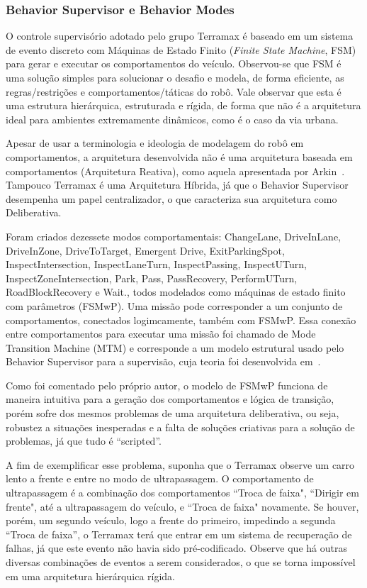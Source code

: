 \subsubsection{Behavior Supervisor e Behavior Modes}

O controle supervisório adotado pelo grupo Terramax é baseado em um sistema de
evento discreto com Máquinas de Estado Finito (\textit{Finite State Machine},
FSM) para gerar e executar os comportamentos do veículo. Observou-se que FSM é
uma solução simples para solucionar o desafio e modela, de forma eficiente, as
regras/restrições e comportamentos/táticas do robô. Vale observar que esta é uma
estrutura hierárquica, estruturada e rígida, de forma que não é a arquitetura
ideal para ambientes extremamente dinâmicos, como é o caso da via urbana. 

Apesar de usar a terminologia e ideologia de modelagem do robô em
comportamentos, a arquitetura desenvolvida não é uma arquitetura baseada em
comportamentos (Arquitetura Reativa), como aquela apresentada por
Arkin~\cite{arkin1998behavior}. Tampouco Terramax é uma Arquitetura
Híbrida, já que o Behavior Supervisor desempenha um papel centralizador, o que 
caracteriza sua arquitetura como Deliberativa.

Foram criados dezessete modos comportamentais: ChangeLane, DriveInLane,
DriveInZone, DriveToTarget, Emergent Drive, ExitParkingSpot,
InspectIntersection, InspectLaneTurn, InspectPassing, InspectUTurn,
InspectZoneIntersection, Park, Pass, PassRecovery, PerformUTurn,
RoadBlockRecovery e Wait., todos modelados como máquinas de estado finito
com parâmetros (FSMwP). Uma missão pode corresponder a um conjunto de
comportamentos, conectados logimcamente, também com FSMwP. Essa conexão entre
comportamentos para executar uma missão foi chamado de Mode Transition Machine
(MTM) e corresponde a um modelo estrutural usado pelo Behavior Supervisor para a
supervisão, cuja teoria foi desenvolvida em~\cite{chen2001safety}.

Como foi comentado pelo próprio autor, o modelo de FSMwP funciona de maneira
intuitiva para a geração dos comportamentos e lógica de transição, porém sofre
dos mesmos problemas de uma arquitetura deliberativa, ou seja, robustez a
situações inesperadas e a falta de soluções criativas para a solução de
problemas, já que tudo é ``scripted''.

A fim de exemplificar esse problema, suponha que o Terramax observe um carro
lento a frente e entre no modo de ultrapassagem. O comportamento de
ultrapassagem é a combinação dos comportamentos ``Troca de faixa", ``Dirigir
em frente", até a ultrapassagem do veículo, e ``Troca de faixa" novamente. Se
houver, porém, um segundo veículo, logo a frente do primeiro, impedindo a
segunda ``Troca de faixa'', o Terramax terá que entrar em um sistema de
recuperação de falhas, já que este evento não havia sido pré-codificado. Observe
que há outras diversas combinações de eventos a serem considerados, o que se
torna impossível em uma arquitetura hierárquica rígida.

